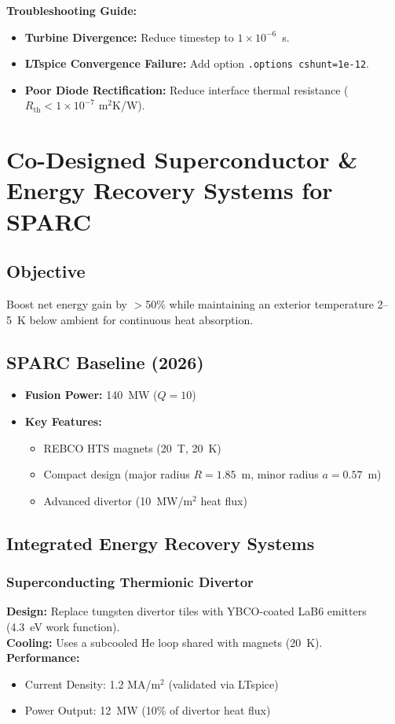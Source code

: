\documentclass[12pt]{article}
\begin{document}
\textbf{Troubleshooting Guide:}
\begin{itemize}
    \item \textbf{Turbine Divergence:} Reduce timestep to $1\times10^{-6}$~s.
    \item \textbf{LTspice Convergence Failure:} Add option \texttt{.options cshunt=1e-12}.
    \item \textbf{Poor Diode Rectification:} Reduce interface thermal resistance ($R_{\text{th}} < 1\times10^{-7}$ m$^2$K/W).
\end{itemize}

\section{Co-Designed Superconductor \& Energy Recovery Systems for SPARC}
\subsection{Objective}
Boost net energy gain by $>$50\% while maintaining an exterior temperature 2--5~K below ambient for continuous heat absorption.

\subsection{SPARC Baseline (2026)}
\begin{itemize}
    \item \textbf{Fusion Power:} 140~MW ($Q=10$)
    \item \textbf{Key Features:}
    \begin{itemize}
        \item REBCO HTS magnets (20~T, 20~K)
        \item Compact design (major radius $R = 1.85$~m, minor radius $a = 0.57$~m)
        \item Advanced divertor (10~MW/m$^2$ heat flux)
    \end{itemize}
\end{itemize}

\subsection{Integrated Energy Recovery Systems}
\subsubsection{Superconducting Thermionic Divertor}
\textbf{Design:} Replace tungsten divertor tiles with YBCO-coated LaB6 emitters (4.3~eV work function).\\
\textbf{Cooling:} Uses a subcooled He loop shared with magnets (20~K).\\
\textbf{Performance:}
\begin{itemize}
    \item Current Density: 1.2 MA/m$^2$ (validated via LTspice)
    \item Power Output: 12~MW (10\% of divertor heat flux)
\end{itemize}
\end{document}
